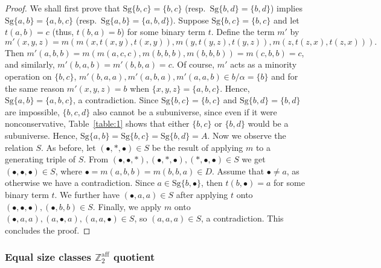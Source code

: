 \documentclass[11pt]{amsart}
\theoremstyle{definition}
\theoremstyle{remark}
\theoremstyle{plain}
\begin{document}
\begin{proof}
We shall first prove that $\mathrm{Sg}\{b,c\}=\{b,c\}$ (resp.~$\mathrm{Sg}\{b,d\}=\{b,d\}$) implies $\mathrm{Sg}\{a,b\}=\{a,b,c\}$ (resp.~$\mathrm{Sg}\{a,b\}=\{a,b,d\}$). Suppose $\mathrm{Sg}\{b,c\}=\{b,c\}$ and let $t(a,b)=c$ (thus, $t(b,a)=b$) for some binary term $t$. Define the term $m'$ by $$m'(x,y,z)=m(m(x,t(x,y),t(x,y)),m(y,t(y,z),t(y,z)),m(z,t(z,x),t(z,x))).$$ Then $m'(a,b,b)=m(m(a,c,c),m(b,b,b),m(b,b,b))=m(c,b,b)=c$, and similarly, $m'(b,a,b)=m'(b,b,a)=c$. Of course, $m'$ acts as a minority operation on $\{b,c\}$, $m'(b,a,a),m'(a,b,a),m'(a,a,b)\in b/\alpha=\{b\}$ and for the same reason $m'(x,y,z)=b$ when $\{x,y,z\}=\{a,b,c\}$. Hence, $\mathrm{Sg}\{a,b\}=\{a,b,c\}$, a contradiction. Since $\mathrm{Sg}\{b,c\}=\{b,c\}$ and $\mathrm{Sg}\{b,d\}=\{b,d\}$ are impossible, $\{b,c,d\}$ also cannot be a subuniverse, since even if it were nonconservative, Table~\ref{table:1} shows that either $\{b,c\}$ or $\{b,d\}$ would be a subuniverse. Hence, $\mathrm{Sg}\{a,b\}=\mathrm{Sg}\{b,c\}=\mathrm{Sg}\{b,d\}=A$. Now we observe the relation $S$. As before, let $(\bullet,\ast,\bullet)\in S$ be the result of applying $m$ to a generating triple of $S$. From $(\bullet,\bullet,\ast),(\bullet,\ast,\bullet),(\ast,\bullet,\bullet)\in S$ we get $(\bullet,\bullet,\bullet)\in S$, where $\bullet=m(a,b,b)=m(b,b,a)\in D$. Assume that $\bullet\neq a$, as otherwise we have a contradiction. Since $a\in\mathrm{Sg}\{b,\bullet\}$, then $t(b,\bullet)=a$ for some binary term $t$. We further have $(\bullet,a,a)\in S$ after applying $t$ onto $(\bullet,\bullet,\bullet),(\bullet,b,b)\in S$. Finally, we apply $m$ onto $(\bullet,a,a),(a,\bullet,a),(a,a,\bullet)\in S$, so $(a,a,a)\in S$, a contradiction. This concludes the proof.
\end{proof}


\subsubsection{Equal size classes $\mathbb{Z}^{\text{aff}}_2$ quotient}
\end{document}
